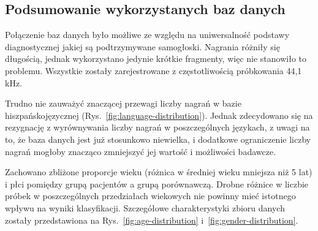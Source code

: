 \subsection{Podsumowanie wykorzystanych baz danych}
\label{subsec:podsumowanie-baz}

Połączenie baz danych było możliwe ze względu na uniwersalność podstawy diagnostycznej jakiej są podtrzymywane samogłoski.
Nagrania różniły się długością, jednak wykorzystano jedynie krótkie fragmenty, więc nie stanowiło to problemu.
Wszystkie zostały zarejestrowane z częstotliwością próbkowania 44,1 kHz.

Trudno nie zauważyć znaczącej przewagi liczby nagrań w bazie hiszpańskojęzycznej (Rys.~\ref{fig:language-distribution}).
Jednak zdecydowano się na rezygnację z wyrównywania liczby nagrań w poszczególnych językach, z uwagi na to, że baza danych jest już stosunkowo niewielka, i dodatkowe ograniczenie liczby nagrań mogłoby znacząco zmniejszyć jej wartość i możliwości badawcze.

Zachowano zbliżone proporcje wieku (różnica w średniej wieku mniejsza niż 5 lat) i płci pomiędzy grupą pacjentów a grupą porównawczą.
Drobne różnice w liczbie próbek w poszczególnych przedziałach wiekowych nie powinny mieć istotnego wpływu na wyniki klasyfikacji.
Szczegółowe charakterystyki zbioru danych zostały przedstawiona na Rys.~\ref{fig:age-distribution} i~\ref{fig:gender-distribution}.


